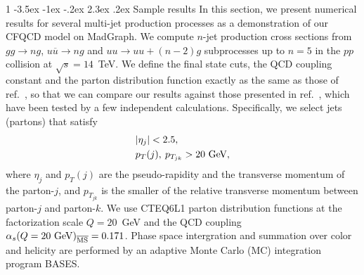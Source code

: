 \documentclass[a4paper,11pt]{article}
\makeatletter
\renewcommand{\section}{%
  \@startsection{section}%
   {1}%
   {\z@}%
   {-3.5ex \@plus -1ex \@minus -.2ex}%
   {2.3ex \@plus.2ex}%
   {\normalfont\large\bfseries}%
}%
\makeatother
\begin{document}
\section{Sample results}
In this section, we present numerical results for several
 multi-jet production processes as a demonstration of our
 CFQCD model on MadGraph. We compute $n$-jet production cross sections from
 $gg\rightarrow ng$, $u\overline{u}\rightarrow ng$ and
 $uu\rightarrow uu+(n-2)g$ subprocesses
 up to $n=5$ in the $pp$ collision at $\sqrt{s}=14$~TeV.
 We define the final state cuts, the QCD coupling constant
 and the parton distribution function exactly as the same
 as those of ref.~\cite{GPU2}, so that we can compare our results
 against those presented in ref.~\cite{GPU2}, which have been
 tested by a few independent calculations.
 Specifically, we select jets (partons) that satisfy
 \begin{subequations}
  \begin{align}
 \label{jet-cuts}
 &|\eta_j| < 2.5,\\
   &p_T(j),\: p_{T_{jk}} > 20~{\mbox{\rm GeV}},
 \end{align}
 \end{subequations}
 where $\eta_j$ and $p_T(j)$ are the pseudo-rapidity and
 the transverse momentum of the parton-$j$,
 and $p_{T_{jk}}$ is the smaller of the relative transverse
 momentum between parton-$j$ and parton-$k$.
 We use CTEQ6L1 parton distribution functions\cite{CTEQ6L1}
 at the factorization scale $Q=20$~GeV and the QCD coupling
 $\alpha_s(Q=20~{\rm GeV})_{\overline{{\rm MS}}}=0.171$.
 Phase space intergration and summation over color and helicity
 are performed by an adaptive Monte Carlo (MC) integration
 program BASES\cite{BASES}.
\end{document}
